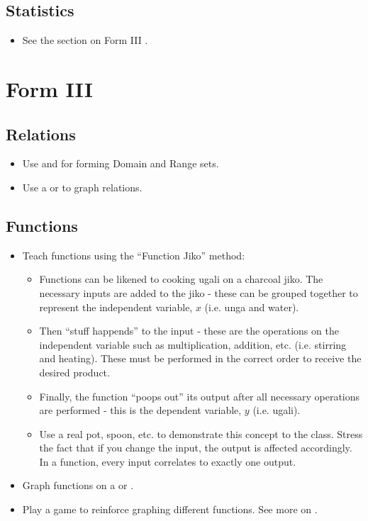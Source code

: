 	\subsection{Statistics}
	\begin{itemize}
	\item See the section on Form III .
	\end{itemize}

\section{Form III}

	\subsection{Relations} \label{relations}
	\begin{itemize}
	\item Use  and  for forming Domain and Range sets.
	\item Use a  or  to graph relations.
	\end{itemize}

	\subsection{Functions} \label{functions}
	\begin{itemize}
	\item Teach functions using the ``Function Jiko'' method:
		\begin{itemize}
		\item Functions can be likened to cooking ugali on a charcoal jiko. The necessary inputs are added to the jiko - these can be grouped together to represent the independent variable, $x$ (i.e. unga and water).
		\item Then ``stuff happends'' to the input - these are the operations on the independent variable such as multiplication, addition, etc. (i.e. stirring and heating). These must be performed in the correct order to receive the desired product.
		\item Finally, the function ``poops out'' its output after all necessary operations are performed - this is the dependent variable, $y$ (i.e. ugali).
		\item Use a real pot, spoon, etc. to demonstrate this concept to the class. Stress the fact that if you change the input, the output is affected accordingly. In a function, every input correlates to exactly one output.
		\end{itemize}
	\item Graph functions on a  or .
	\item Play a  game to reinforce graphing different functions. See more  on .
	
	\end{itemize}


